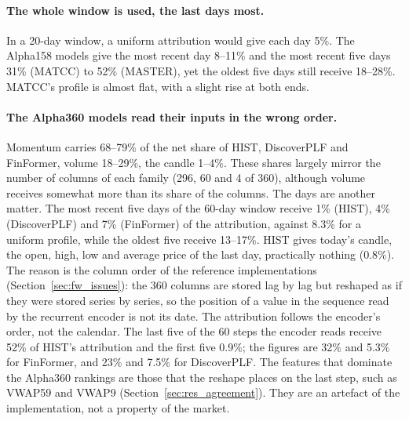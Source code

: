 \paragraph{The whole window is used, the last days most.} In a 20-day window, a uniform attribution would give each day 5\%. The Alpha158 models give the most recent day 8--11\% and the most recent five days 31\% (MATCC) to 52\% (MASTER), yet the oldest five days still receive 18--28\%. MATCC's profile is almost flat, with a slight rise at both ends.

\paragraph{The Alpha360 models read their inputs in the wrong order.} Momentum carries 68--79\% of the net share of HIST, DiscoverPLF and FinFormer, volume 18--29\%, the candle 1--4\%. These shares largely mirror the number of columns of each family (296, 60 and 4 of 360), although volume receives somewhat more than its share of the columns. The days are another matter. The most recent five days of the 60-day window receive 1\% (HIST), 4\% (DiscoverPLF) and 7\% (FinFormer) of the attribution, against 8.3\% for a uniform profile, while the oldest five receive 13--17\%. HIST gives today's candle, the open, high, low and average price of the last day, practically nothing (0.8\%). The reason is the column order of the reference implementations (Section~\ref{sec:fw_issues}): the 360 columns are stored lag by lag but reshaped as if they were stored series by series, so the position of a value in the sequence read by the recurrent encoder is not its date. The attribution follows the encoder's order, not the calendar. The last five of the 60 steps the encoder reads receive 52\% of HIST's attribution and the first five 0.9\%; the figures are 32\% and 5.3\% for FinFormer, and 23\% and 7.5\% for DiscoverPLF. The features that dominate the Alpha360 rankings are those that the reshape places on the last step, such as VWAP59 and VWAP9 (Section~\ref{sec:res_agreement}). They are an artefact of the implementation, not a property of the market.

